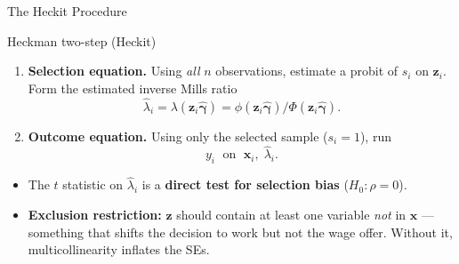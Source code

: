 \documentclass[aspectratio=169, 12pt]{beamer}
\begin{document}
\begin{frame}[shrink=10]{The Heckit Procedure}

  \begin{definitionbox}{Heckman two-step (Heckit)}
    \begin{enumerate}
      \item \textbf{Selection equation.} Using \emph{all} $n$ observations, estimate a
        probit of $s_i$ on $\mathbf{z}_i$. Form the estimated inverse Mills ratio
        \[
          \hat\lambda_i = \lambda(\mathbf{z}_i\hat{\boldsymbol\gamma})
            = \phi(\mathbf{z}_i\hat{\boldsymbol\gamma})/\Phi(\mathbf{z}_i\hat{\boldsymbol\gamma}).
        \]
      \item \textbf{Outcome equation.} Using only the selected sample ($s_i=1$), run
        \[
          y_i \;\text{ on }\; \mathbf{x}_i,\; \hat\lambda_i .
        \]
    \end{enumerate}
  \end{definitionbox}

  \smallskip

  \begin{keybox}
    \begin{itemize}
      \item The $t$ statistic on $\hat\lambda_i$ is a \textbf{direct test for
        selection bias} ($H_0:\rho=0$).
      \item \textbf{Exclusion restriction:} $\mathbf{z}$ should contain at least one
        variable \emph{not} in $\mathbf{x}$ --- something that shifts the decision to
        work but not the wage offer. Without it, multicollinearity inflates the SEs.
    \end{itemize}
  \end{keybox}

\end{frame}
\end{document}
